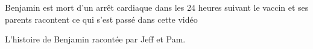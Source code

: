 Benjamin est mort d'un arrêt cardiaque dans les 24 heures suivant le vaccin et
ses parents racontent ce qui s'est passé dans cette vidéo

L'histoire de Benjamin racontée par Jeff et Pam.

